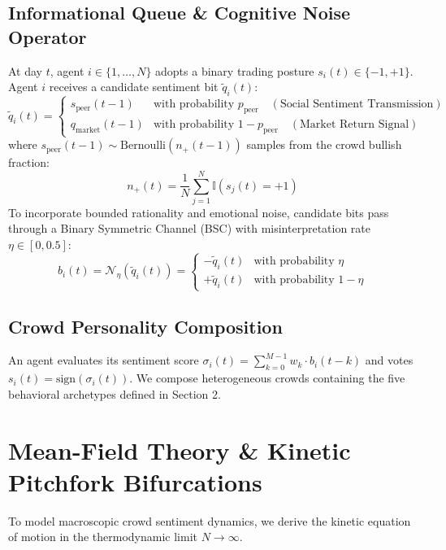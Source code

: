 \documentclass[11pt,a4paper]{article}
\begin{document}
\subsection{Informational Queue & Cognitive Noise Operator}
At day $t$, agent $i \in \{1, \dots, N\}$ adopts a binary trading posture $s_i(t) \in \{-1, +1\}$. Agent $i$ receives a candidate sentiment bit $\tilde{q}_i(t)$:
\begin{equation}
    \tilde{q}_i(t) = 
    \begin{cases}
        s_{\text{peer}}(t-1) & \text{with probability } p_{\text{peer}} \quad (\text{Social Sentiment Transmission}) \\
        q_{\text{market}}(t-1) & \text{with probability } 1 - p_{\text{peer}} \quad (\text{Market Return Signal})
    \end{cases}
\end{equation}
where $s_{\text{peer}}(t-1) \sim \text{Bernoulli}(n_+(t-1))$ samples from the crowd bullish fraction:
\begin{equation}
    n_+(t) = \frac{1}{N} \sum_{j=1}^N \mathbb{I}(s_j(t) = +1)
\end{equation}
To incorporate bounded rationality and emotional noise, candidate bits pass through a Binary Symmetric Channel (BSC) with misinterpretation rate $\eta \in [0, 0.5]$:
\begin{equation}
    b_i(t) = \mathcal{N}_\eta \left( \tilde{q}_i(t) \right) = 
    \begin{cases}
        -\tilde{q}_i(t) & \text{with probability } \eta \\
        +\tilde{q}_i(t) & \text{with probability } 1 - \eta
    \end{cases}
\end{equation}

\subsection{Crowd Personality Composition}
An agent evaluates its sentiment score $\sigma_i(t) = \sum_{k=0}^{M-1} w_k \cdot b_i(t-k)$ and votes $s_i(t) = \text{sign}(\sigma_i(t))$. We compose heterogeneous crowds containing the five behavioral archetypes defined in Section 2.

\section{Mean-Field Theory \& Kinetic Pitchfork Bifurcations}

To model macroscopic crowd sentiment dynamics, we derive the kinetic equation of motion in the thermodynamic limit $N \to \infty$.
\end{document}
